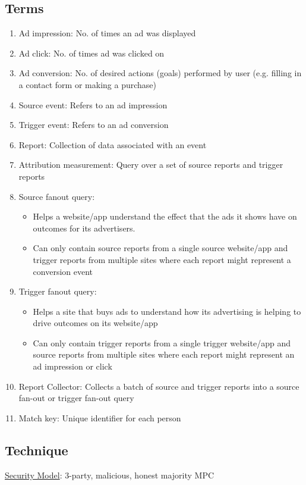 \subsection{Terms}
\begin{enumerate}
    \item Ad impression: No. of times an ad was displayed
    \item Ad click: No. of times ad was clicked on
    \item Ad conversion: No. of desired actions (goals) performed by user (e.g. filling in a contact form or making a purchase)
    \item Source event: Refers to an ad impression
    \item Trigger event: Refers to an ad conversion
    \item Report: Collection of data associated with an event
    \item Attribution measurement: Query over a set of source reports and trigger reports
    \item Source fanout query:
    \begin{itemize}
        \item Helps a website/app understand the effect that the ads it shows have on outcomes for its advertisers.
        \item Can only contain source reports from a single source website/app and trigger reports from multiple sites where each report might represent a conversion event
    \end{itemize}
    \item Trigger fanout query:
    \begin{itemize}
        \item Helps a site that buys ads to understand how its advertising is helping to drive outcomes on its website/app
        \item Can only contain trigger reports from a single trigger website/app and source reports from multiple sites where each report might represent an ad impression or click
    \end{itemize}
    \item Report Collector: Collects a batch of source and trigger reports into a source fan-out or trigger fan-out query
    \item Match key: Unique identifier for each person
\end{enumerate}

\subsection{Technique}
\underline{Security Model}: 3-party, malicious, honest majority MPC \\

